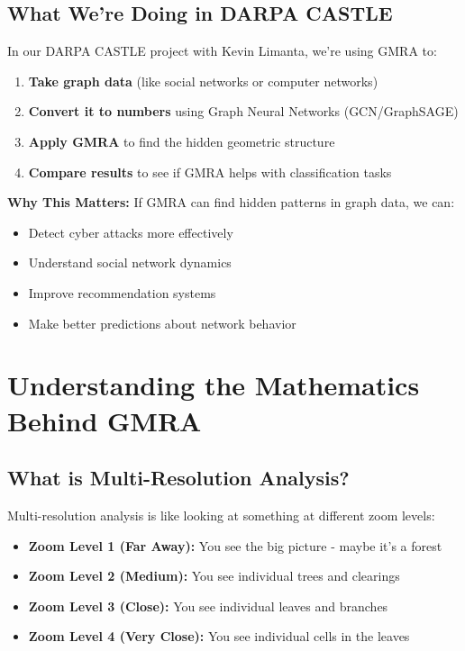\documentclass[12pt]{article}
\begin{document}
\subsection{What We're Doing in DARPA CASTLE}

In our DARPA CASTLE project with Kevin Limanta, we're using GMRA to:
\begin{enumerate}
    \item \textbf{Take graph data} (like social networks or computer networks)
    \item \textbf{Convert it to numbers} using Graph Neural Networks (GCN/GraphSAGE)
    \item \textbf{Apply GMRA} to find the hidden geometric structure
    \item \textbf{Compare results} to see if GMRA helps with classification tasks
\end{enumerate}

\textbf{Why This Matters:} If GMRA can find hidden patterns in graph data, we can:
\begin{itemize}
    \item Detect cyber attacks more effectively
    \item Understand social network dynamics
    \item Improve recommendation systems
    \item Make better predictions about network behavior
\end{itemize}

\section{Understanding the Mathematics Behind GMRA}

\subsection{What is Multi-Resolution Analysis?}

Multi-resolution analysis is like looking at something at different zoom levels:
\begin{itemize}
    \item \textbf{Zoom Level 1 (Far Away):} You see the big picture - maybe it's a forest
    \item \textbf{Zoom Level 2 (Medium):} You see individual trees and clearings
    \item \textbf{Zoom Level 3 (Close):} You see individual leaves and branches
    \item \textbf{Zoom Level 4 (Very Close):} You see individual cells in the leaves
\end{itemize}
\end{document}
